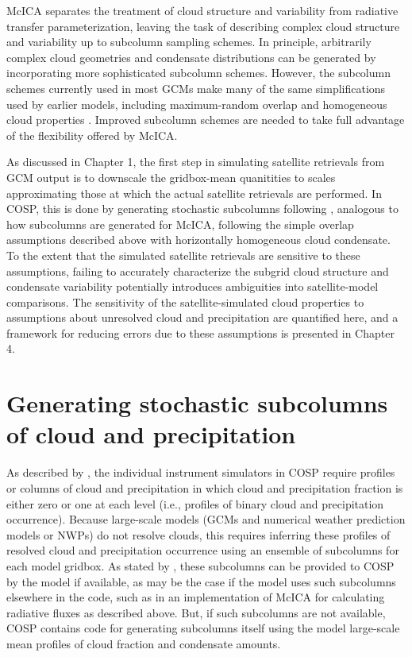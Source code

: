 McICA separates the treatment of cloud structure and variability from
radiative transfer parameterization, leaving the task of describing
complex cloud structure and variability up to subcolumn sampling
schemes. In principle, arbitrarily complex cloud geometries and
condensate distributions can be generated by incorporating more
sophisticated subcolumn schemes. However, the subcolumn schemes
currently used in most GCMs make many of the same simplifications used
by earlier models, including maximum-random overlap and homogeneous
cloud properties \citep[e.g.;][]{neale_et_al_2010a, neale_et_al_2010b}.
Improved subcolumn schemes are needed to take full advantage of the
flexibility offered by McICA.

As discussed in Chapter 1, the first step in simulating satellite
retrievals from GCM output is to downscale the gridbox-mean quanitities
to scales approximating those at which the actual satellite retrievals
are performed. In COSP, this is done by generating stochastic subcolumns
following \citet{klein_and_jakob_1999}, analogous to how subcolumns are
generated for McICA, following the simple overlap assumptions described
above with horizontally homogeneous cloud condensate. To the extent that
the simulated satellite retrievals are sensitive to these assumptions,
failing to accurately characterize the subgrid cloud structure and
condensate variability potentially introduces ambiguities into
satellite-model comparisons. The sensitivity of the satellite-simulated
cloud properties to assumptions about unresolved cloud and precipitation
are quantified here, and a framework for reducing errors due to these
assumptions is presented in Chapter 4.

\section{Generating stochastic subcolumns of cloud and
precipitation}\label{sec:subgrid1Scops}

As described by \citet{bodas-salcedo_et_al_2011}, the individual
instrument simulators in COSP require profiles or columns of cloud and
precipitation in which cloud and precipitation fraction is either zero
or one at each level (i.e., profiles of binary cloud and precipitation
occurrence). Because large-scale models (GCMs and numerical weather
prediction models or NWPs) do not resolve clouds, this requires
inferring these profiles of resolved cloud and precipitation occurrence
using an ensemble of subcolumns for each model gridbox. As stated by
\citet{bodas-salcedo_et_al_2011}, these subcolumns can be provided to
COSP by the model if available, as may be the case if the model uses
such subcolumns elsewhere in the code, such as in an implementation of
McICA for calculating radiative fluxes as described above. But, if such
subcolumns are not available, COSP contains code for generating
subcolumns itself using the model large-scale mean profiles of cloud
fraction and condensate amounts.

